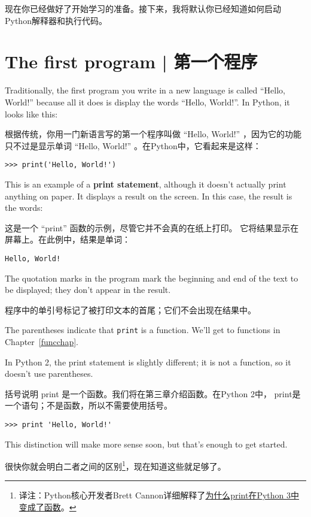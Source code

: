 现在你已经做好了开始学习的准备。接下来，我将默认你已经知道如何启动Python解释器和执行代码。


\section{The first program  |  第一个程序}
\label{hello}

Traditionally, the first program you write in a new language
is called ``Hello, World!'' because all it does is display the
words ``Hello, World!''.  In Python, it looks like this:

根据传统，你用一门新语言写的第一个程序叫做 ``Hello, World!'' ，因为它的功能只不过是显示单词 ``Hello, World!'' 。在Python中，它看起来是这样：

\begin{lstlisting}
>>> print('Hello, World!')
\end{lstlisting}
%
This is an example of a {\bf print statement}, although it
doesn't actually print anything on paper.  It displays a result on the
screen.  In this case, the result is the words:


这是一个 ``print'' 函数的示例，尽管它并不会真的在纸上打印。  它将结果显示在屏幕上。在此例中，结果是单词：

\begin{lstlisting}
Hello, World!
\end{lstlisting}
%
The quotation marks in the program mark the beginning and end
of the text to be displayed; they don't appear in the result.

程序中的单引号标记了被打印文本的首尾；它们不会出现在结果中。
    

The parentheses indicate that {\tt print} is a function.  We'll get
to functions in Chapter~\ref{funcchap}.
 

In Python 2, the print statement is slightly different; it is not
a function, so it doesn't use parentheses.

括号说明 print 是一个函数。我们将在第三章介绍函数。在Python 2中， print是一个语句；不是函数，所以不需要使用括号。

\begin{lstlisting}
>>> print 'Hello, World!'
\end{lstlisting}
%
This distinction will make more sense soon, but that's enough to
get started.

很快你就会明白二者之间的区别\footnote{译注：Python核心开发者Brett Cannon详细解释了\href{http://codingpy.com/article/why-print-became-a-function-in-python-3/}{为什么print在Python 3中变成了函数}。}，现在知道这些就足够了。


